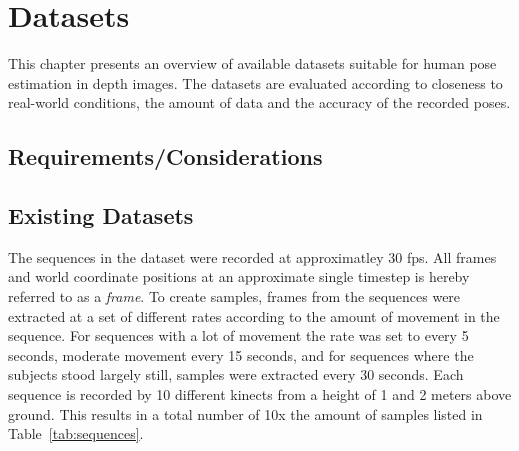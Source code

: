 \chapter{Datasets}

This chapter presents an overview of available datasets suitable for human pose estimation in depth images. The datasets are evaluated according to closeness to real-world conditions, the amount of data and the accuracy of the recorded poses.

\section{Requirements/Considerations}

\section{Existing Datasets}

The sequences in the dataset were recorded at approximatley 30 fps. All frames and world coordinate positions at an approximate single timestep is hereby referred to as a \emph{frame}. To create samples, frames from the sequences were extracted at a set of different rates according to the amount of movement in the sequence. For sequences with a lot of movement the rate was set to every 5 seconds, moderate movement every 15 seconds, and for sequences where the subjects stood largely still, samples were extracted every 30 seconds. Each sequence is recorded by 10 different kinects from a height of 1 and 2 meters above ground. This results in a total number of 10x the amount of samples listed in Table~\ref{tab:sequences}.


